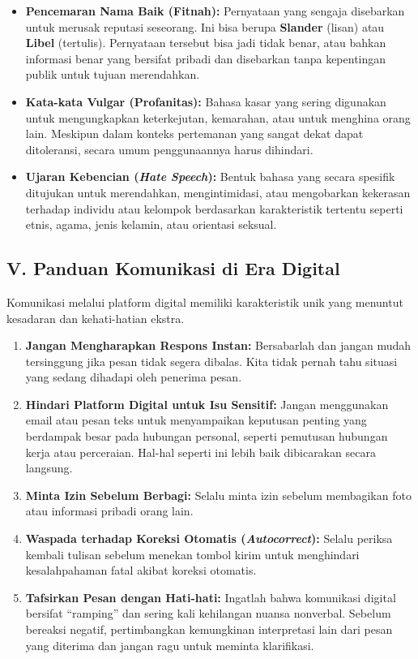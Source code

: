 \documentclass[
  letterpaper,
  DIV=11,
  numbers=noendperiod]{scrreprt}
\begin{document}
\begin{itemize}
\item
  \textbf{Pencemaran Nama Baik (Fitnah):} Pernyataan yang sengaja
  disebarkan untuk merusak reputasi seseorang. Ini bisa berupa
  \textbf{Slander} (lisan) atau \textbf{Libel} (tertulis). Pernyataan
  tersebut bisa jadi tidak benar, atau bahkan informasi benar yang
  bersifat pribadi dan disebarkan tanpa kepentingan publik untuk tujuan
  merendahkan.
\item
  \textbf{Kata-kata Vulgar (Profanitas):} Bahasa kasar yang sering
  digunakan untuk mengungkapkan keterkejutan, kemarahan, atau untuk
  menghina orang lain. Meskipun dalam konteks pertemanan yang sangat
  dekat dapat ditoleransi, secara umum penggunaannya harus dihindari.
\item
  \textbf{Ujaran Kebencian (\emph{Hate Speech}):} Bentuk bahasa yang
  secara spesifik ditujukan untuk merendahkan, mengintimidasi, atau
  mengobarkan kekerasan terhadap individu atau kelompok berdasarkan
  karakteristik tertentu seperti etnis, agama, jenis kelamin, atau
  orientasi seksual.
\end{itemize}

\subsection{V. Panduan Komunikasi di Era
Digital}\label{v.-panduan-komunikasi-di-era-digital}

Komunikasi melalui platform digital memiliki karakteristik unik yang
menuntut kesadaran dan kehati-hatian ekstra.

\begin{enumerate}
\def\labelenumi{\arabic{enumi}.}
\item
  \textbf{Jangan Mengharapkan Respons Instan:} Bersabarlah dan jangan
  mudah tersinggung jika pesan tidak segera dibalas. Kita tidak pernah
  tahu situasi yang sedang dihadapi oleh penerima pesan.
\item
  \textbf{Hindari Platform Digital untuk Isu Sensitif:} Jangan
  menggunakan email atau pesan teks untuk menyampaikan keputusan penting
  yang berdampak besar pada hubungan personal, seperti pemutusan
  hubungan kerja atau perceraian. Hal-hal seperti ini lebih baik
  dibicarakan secara langsung.
\item
  \textbf{Minta Izin Sebelum Berbagi:} Selalu minta izin sebelum
  membagikan foto atau informasi pribadi orang lain.
\item
  \textbf{Waspada terhadap Koreksi Otomatis (\emph{Autocorrect}):}
  Selalu periksa kembali tulisan sebelum menekan tombol kirim untuk
  menghindari kesalahpahaman fatal akibat koreksi otomatis.
\item
  \textbf{Tafsirkan Pesan dengan Hati-hati:} Ingatlah bahwa komunikasi
  digital bersifat ``ramping'' dan sering kali kehilangan nuansa
  nonverbal. Sebelum bereaksi negatif, pertimbangkan kemungkinan
  interpretasi lain dari pesan yang diterima dan jangan ragu untuk
  meminta klarifikasi.
\end{enumerate}
\end{document}

